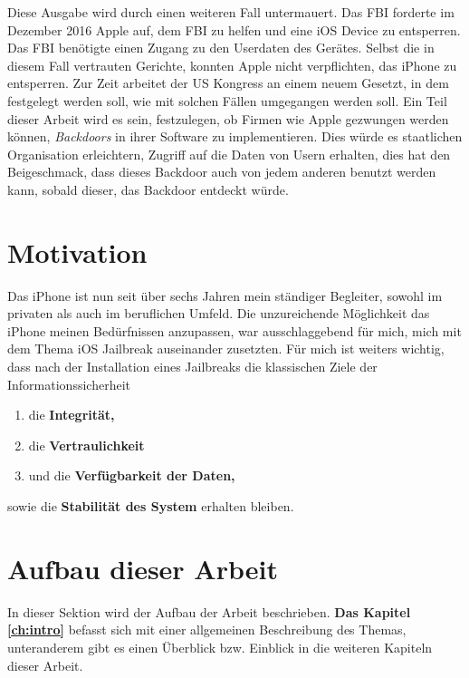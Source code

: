 Diese Ausgabe wird durch einen weiteren Fall untermauert. Das FBI forderte im Dezember 2016 Apple auf, dem FBI zu helfen und eine iOS Device zu entsperren. Das FBI benötigte einen Zugang zu den Userdaten des Gerätes. Selbst die in diesem Fall vertrauten Gerichte, konnten Apple nicht verpflichten, das iPhone zu entsperren. Zur Zeit arbeitet der US Kongress an einem neuem Gesetzt, in dem festgelegt werden soll, wie mit solchen Fällen umgegangen werden soll. Ein Teil dieser Arbeit wird es sein, festzulegen, ob Firmen wie Apple gezwungen werden können, \textit{\glqq Backdoors\grqq{}} in ihrer Software zu implementieren. Dies würde es staatlichen Organisation erleichtern, Zugriff auf die Daten von Usern erhalten, dies hat den Beigeschmack, dass dieses Backdoor auch von jedem anderen benutzt werden kann, sobald dieser, das Backdoor entdeckt würde.

\section{Motivation }
\label{sec:IntroMotivation}
Das iPhone ist nun seit über sechs Jahren mein ständiger Begleiter, sowohl im privaten als auch im beruflichen Umfeld. Die unzureichende Möglichkeit das iPhone meinen Bedürfnissen anzupassen, war ausschlaggebend für mich, mich mit dem Thema iOS Jailbreak auseinander zusetzten. 
Für mich ist weiters wichtig, dass nach der Installation eines Jailbreaks die klassischen Ziele der Informationssicherheit
\begin{enumerate}
    \item die \textbf{Integrität,}
    \item die \textbf{Vertraulichkeit} 
    \item und die \textbf{Verfügbarkeit der Daten,}
\end{enumerate}
sowie die \textbf{Stabilität des System} erhalten bleiben.


\section{Aufbau dieser Arbeit}
\label{sec:IntroAufbau}
In dieser Sektion wird der Aufbau der Arbeit beschrieben. \textbf{Das Kapitel \ref{ch:intro}} befasst sich mit einer allgemeinen Beschreibung des Themas, unteranderem gibt es einen Überblick bzw. Einblick in die weiteren Kapiteln dieser Arbeit.


